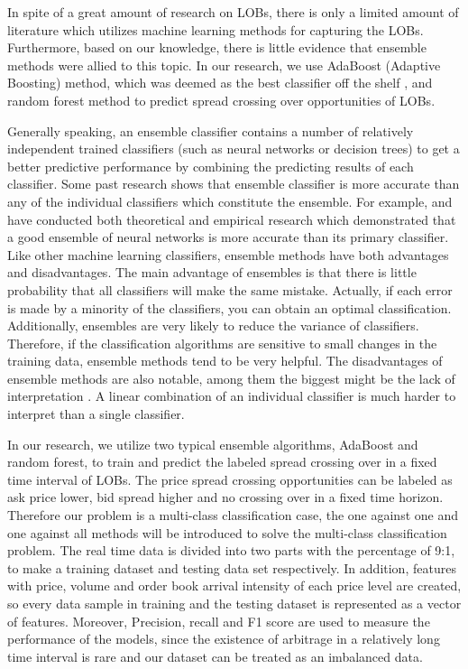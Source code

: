 In spite of a great amount of research on LOBs,  there is only a limited amount of literature which utilizes machine learning methods for capturing the LOBs. Furthermore,  based on our knowledge,  there is little evidence that ensemble methods were allied to this topic. In our research,  we  use AdaBoost (Adaptive Boosting) method,  which was deemed as the best classifier off the shelf \citep{kegl2013return},  and random forest method to predict spread crossing over opportunities of LOBs. 

Generally speaking,  an ensemble classifier contains a number of relatively independent trained classifiers (such as neural networks or decision trees) to get a better predictive performance by combining the predicting results of each classifier. Some past research shows that ensemble classifier is more accurate than any of the individual classifiers which constitute the ensemble. For example,  \cite{hansen1990neural} and \cite{hashem1997optimal} have conducted both theoretical and empirical research which demonstrated that a good ensemble of neural networks is more accurate than its primary classifier. \\

Like other machine learning classifiers,  ensemble methods have both advantages and disadvantages. The main advantage of ensembles is that there is little probability that all classifiers will make the same mistake. Actually,  if each error is made by a minority of the classifiers,  you can obtain an optimal classification. Additionally,  ensembles are very likely to reduce the variance of classifiers. Therefore,  if the classification algorithms are sensitive to small changes in the training data,  ensemble methods tend to be very helpful.
The disadvantages of ensemble methods are also notable,  among them the biggest might be the lack of interpretation \citep{buhlmann2012bagging}.  A linear combination of an individual classifier is much harder to interpret than a single classifier. 

In our research,  we utilize two typical ensemble algorithms,  AdaBoost and random forest,  to train and predict the labeled spread crossing over in a fixed time interval of LOBs. The price spread crossing opportunities can be labeled as ask price lower,  bid spread higher and no crossing over in a fixed time horizon. Therefore our problem is a multi-class classification case,  the one against one and one against all methods will be introduced to solve the multi-class classification problem. The real time data is divided into two parts with the percentage of 9:1,  to make a training dataset and testing data set respectively. In addition,  features with price,  volume and order book arrival intensity of each price level are created, so every data sample in training and the testing dataset is represented as a vector of features. Moreover,  Precision,  recall and F1 score are used to measure the performance of the models,  since the existence of arbitrage in a relatively long time interval is rare and our dataset can be treated as an imbalanced data.  

